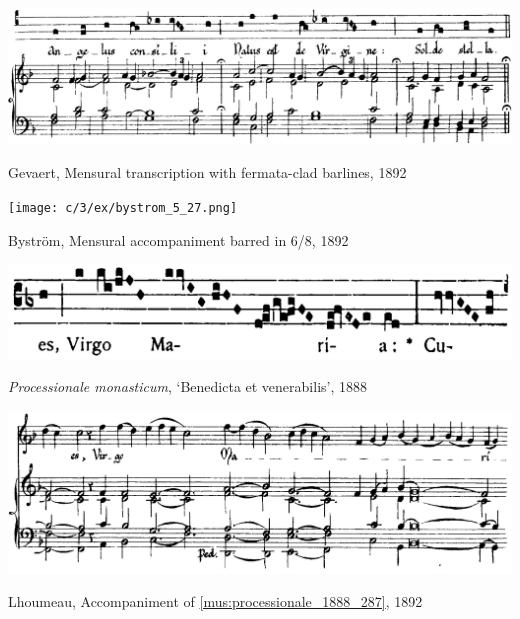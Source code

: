 \vspace*{\fill}

\clearpage

\vspace*{\fill}

\begin{example}
  \centering
  \includegraphics[width=\linewidth]{c/3/ex/gevaert_4_3.png}
  \caption{Gevaert, Mensural transcription with fermata-clad barlines, 1892}
  \label{mus:gevaert_4_3}
\end{example}

\vspace*{\fill}

\begin{example}
  \centering
  \texttt{[image: c/3/ex/bystrom\_5\_27.png]}
  \caption{Byström, Mensural accompaniment barred in 6/8, 1892}
  \label{mus:bystrom_5_27}
\end{example}

\vspace*{\fill}

\clearpage

\vspace*{\fill}

\begin{example}
  \centering
  \includegraphics[width=.7\linewidth]{c/3/ex/processionale_1888_287.png}
  \caption{\emph{Processionale monasticum}, `Benedicta et venerabilis', 1888}
  \label{mus:processionale_1888_287}
\end{example}

\vspace*{\fill}

\begin{example}
  \centering
  \includegraphics[width=\linewidth]{c/3/ex/lhoumeau_benedicta_5_12.png}
  \caption{Lhoumeau, Accompaniment of \cref{mus:processionale_1888_287}, 1892}
  \label{mus:lhoumeau_benedicta_5_12}
\end{example}


